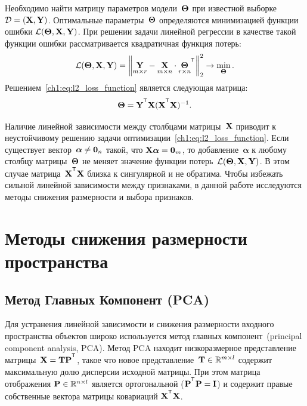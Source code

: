 Необходимо найти матрицу параметров модели~$\boldsymbol{\Theta}$ при известной выборке~$\mathcal{D} = \left( \mathbf{X}, \mathbf{Y} \right)$.
Оптимальные параметры~$\boldsymbol{\Theta}$ определяются минимизацией функции ошибки $\mathcal{L}(\boldsymbol{\Theta}, \mathbf{X}, \mathbf{Y})$.
При решении задачи линейной регрессии в качестве такой функции ошибки рассматривается квадратичная функция потерь:
\begin{equation}
	\cL(\bTheta, \bX, \bY) = {\left\| \underset{m \times r}{\mathbf{Y}}  - \underset{m \times n}{\bX} \cdot \underset{r \times n}{\bTheta}^{\T} \right\| }_2^2 \rightarrow\min_{\bTheta}.
	\label{ch1:eq:l2_loss_function}
\end{equation}
Решением~\eqref{ch1:eq:l2_loss_function} является следующая матрица:
\begin{equation*}
	\bTheta = \bY^{\T} \bX (\bX^{\T} \bX)^{-1}.
\end{equation*}

Наличие линейной зависимости между столбцами матрицы~$\mathbf{X}$ приводит к неустойчивому решению задачи оптимизации~\eqref{ch1:eq:l2_loss_function}.
Если существует вектор~$\boldsymbol{\alpha} \neq \boldsymbol{0}_n$ такой, что $\mathbf{X} \boldsymbol{\alpha}= \boldsymbol{0}_m$, то добавление~$\boldsymbol{\alpha}$ к любому столбцу матрицы~$\boldsymbol{\Theta}$ не меняет значение функции потерь~$\mathcal{L}(\boldsymbol{\Theta}, \mathbf{X}, \mathbf{Y})$.
В этом случае матрица~$\bX^{\T} \bX$ близка к сингулярной и не обратима.
Чтобы избежать сильной линейной зависимости между признаками, в данной работе исследуются методы снижения размерности и выбора признаков.


\section{Методы снижения размерности пространства}
\label{ch1:sec_lin_reg}


\subsection{Метод Главных Компонент (PCA)}

Для устранения линейной зависимости и снижения размерности входного пространства объектов широко используется метод главных компонент~(principal component analysis, PCA). 
Метод PCA находит низкоразмерное представление матрицы~$\bX = \bT \bP^{\T}$, такое что новое представление~$\mathbf{T} \in \mathbb{R}^{m \times l}$ содержит максимальную долю дисперсии исходной матрицы.
При этом матрица отображения $\mathbf{P} \in \mathbb{R}^{n \times l}$ является ортогональной ($\bP^{\T} \bP = \bI$) и содержит правые собственные вектора матрицы ковариаций $\bX^{\T} \bX$.

